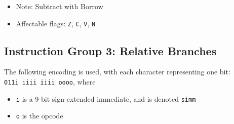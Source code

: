 \documentclass{article}
\begin{document}
\begin{itemize}
\begin{itemize}
			\item Note: Subtract with Borrow
			\item Affectable flags:
				\texttt{Z}, \texttt{C}, \texttt{V}, \texttt{N}
		\end{itemize}
	\end{itemize}




	\doublespacing
	\subsection{Instruction Group 3: Relative Branches}
	The following encoding is used, with each character representing one
	bit: \\
	\texttt{011i iiii iiii oooo}, where

	\singlespacing
	\begin{itemize}
		\item \texttt{i} is a 9-bit sign-extended immediate, and is denoted
		\texttt{simm}
		\item \texttt{o} is the opcode
	\end{itemize}
	\doublespacing
\end{document}
